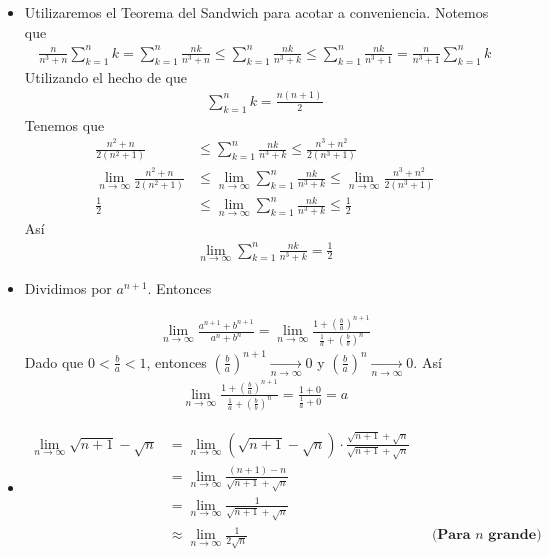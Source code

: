 \documentclass[12pt]{book}
\begin{document}
\begin{itemize}
    \item[\textbf{c)}] Utilizaremos el Teorema del Sandwich para acotar a conveniencia. Notemos que
    \begin{align*}
        \frac{n}{n^3+n}\sum_{k=1}^nk= \sum_{k=1}^n \frac{nk}{n^3+n}\leq \sum_{k=1}^n\frac{nk}{n^3+k} \leq \sum_{k=1}^n \frac{nk}{n^3+1}=\frac{n}{n^3+1}\sum_{k=1}^n k
    \end{align*}
    Utilizando el hecho de que 
    \begin{align*}
        \sum_{k=1}^n k=\frac{n(n+1)}{2}
    \end{align*}
    Tenemos que 
    \begin{align*}
        \frac{n^2+n}{2(n^2+1)} &\leq \sum_{k=1}^n \frac{nk}{n^3+k} \leq \frac{n^3+n^2}{2(n^3+1)} \\
        \lim_{n\to \infty}  \frac{n^2+n}{2(n^2+1)} &\leq \lim_{n\to \infty} \sum_{k=1}^n \frac{nk}{n^3+k} \leq  \lim_{n\to \infty}  \frac{n^3+n^2}{2(n^3+1)}\\
        \frac{1}{2} &\leq \lim_{n\to \infty} \sum_{k=1}^n \frac{nk}{n^3+k} \leq  \frac{1}{2}
    \end{align*}
    Así 
    \begin{align*}
        \lim_{n\to \infty} \sum_{k=1}^n \frac{nk}{n^3+k} = \frac{1}{2}
    \end{align*}

    \item[\textbf{d)}] Dividimos por $a^{n+1}$. Entonces

    \begin{align*}
        \lim_{n \to \infty} \frac{a^{n+1}+b^{n+1}}{a^n+b^n}=\lim_{n \to \infty} \frac{1+\left(\frac{b}{a}\right)^{n+1}}{\frac{1}{a}+\left(\frac{b}{b}\right)^n}
    \end{align*}
    Dado que $0<\displaystyle \frac{b}{a}<1$, entonces $\displaystyle \left(\frac{b}{a} \right)^{n+1} \underset{n \to \infty}{\longrightarrow} 0 $ y $\left(\frac{b}{a} \right)^{n} \underset{n \to \infty}{\longrightarrow} 0 $. Así 
    \begin{align*}
        \lim_{n \to \infty} \frac{1+\left(\frac{b}{a}\right)^{n+1}}{\frac{1}{a}+\left(\frac{b}{b}\right)^n} = \frac{1+0}{\frac{1}{a}+0}=a
    \end{align*}
    \item[\textbf{e)}]

    \begin{align*}
        \lim_{n \to \infty} \sqrt{n+1}-\sqrt{n}&=\lim_{n \to \infty} \left(\sqrt{n+1}-\sqrt{n} \right) \cdot \frac{\sqrt{n+1}+\sqrt{n}}{\sqrt{n+1}+\sqrt{n}} \\
        &= \lim_{n \to \infty}  \frac{(n+1)-n}{\sqrt{n+1}+\sqrt{n}} \\
        &= \lim_{n \to \infty} \frac{1}{\sqrt{n+1}+\sqrt{n}} \\
        &\approx  \lim_{n \to \infty} \frac{1}{2 \sqrt{n}} && \textbf{(Para $n$ grande)}
    \end{align*}


\end{itemize}
\end{document}
